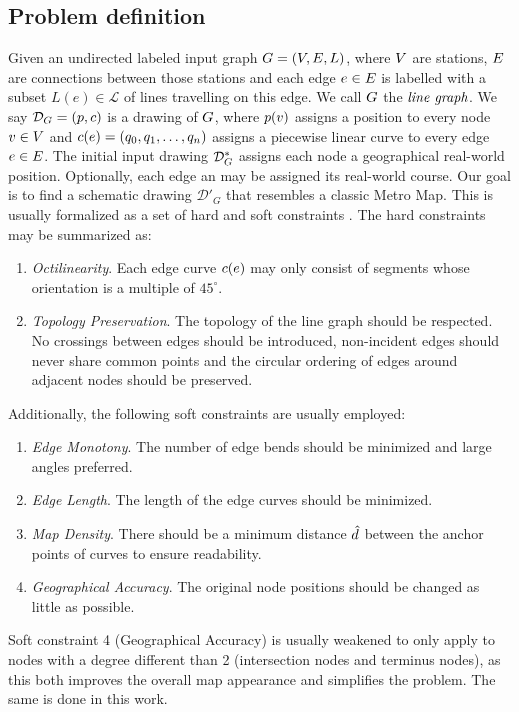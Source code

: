 \documentclass[sigconf]{acmart}
\begin{document}
\subsection{Problem definition}

Given an undirected labeled input graph $G = (V, E, L)$, where $V$ are stations, $E$ are connections between those stations and each edge $e \in E$ is labelled with a subset $L(e) \in \mathcal{L}$ of lines travelling on this edge.
We call $G$ the $\emph{line graph}$.
We say $\mathcal{D}_{G} = (p, c)$ is a drawing of $G$, where $p(v)$ assigns a position to every node $v \in V$ and $c(e) = (q_0, q_1, \dots, q_n)$ assigns a piecewise linear curve to every edge $e \in E$.
The initial input drawing $\mathcal{D}_{G}^*$ assigns each node a geographical real-world position.
Optionally, each edge an may be assigned its real-world course.
Our goal is to find a schematic drawing $\mathcal{D}'_G$ that resembles a classic Metro Map.
This is usually formalized as a set of hard and soft constraints \cite{noll05, noll11}.
The hard constraints may be summarized as:
%
\begin{enumerate}
\setlength\itemsep{.1em}
\item \emph{Octilinearity}. Each edge curve $c(e)$ may only consist of segments whose orientation is a multiple of $45^{\circ}$.
\item \emph{Topology Preservation}. The topology of the line graph should be respected. No crossings between edges should be introduced, non-incident edges should never share common points and the circular ordering of edges around adjacent nodes should be preserved.
\end{enumerate}
%
Additionally, the following soft constraints are usually employed:
%
\begin{enumerate}
\setlength\itemsep{.1em}
\item \emph{Edge Monotony}. The number of edge bends should be minimized and large angles preferred.
\item \emph{Edge Length}. The length of the edge curves should be minimized.
\item \emph{Map Density}. There should be a minimum distance $\hat d$ between the anchor points of curves to ensure readability.
\item \emph{Geographical Accuracy}. The original node positions should be changed as little as possible.
\end{enumerate}
%
Soft constraint 4 (Geographical Accuracy) is usually weakened to only apply to nodes with a degree different than 2 (intersection nodes and terminus nodes), as this both improves the overall map appearance and simplifies the problem.
The same is done in this work.
\end{document}

